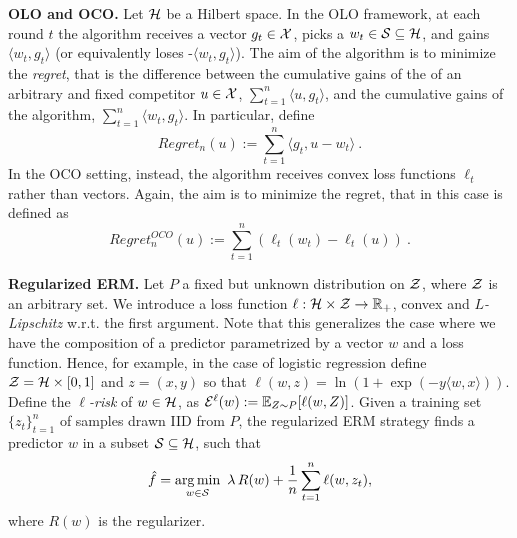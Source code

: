 \vspace{0.2cm}\noindent\textbf{\ac{OLO} and \ac{OCO}.}
Let $\mathcal{H}$ be a Hilbert space. In the \ac{OLO} framework, at each round $t$ the algorithm receives a vector $g_t \in \mathcal{X}$, picks a $w_t \in \mathcal{S} \subseteq \mathcal{H}$, and gains $\langle w_t,g_t \rangle$ (or equivalently loses -$\langle w_t,g_t \rangle$).
The aim of the algorithm is to minimize the \emph{regret}, that is the difference between the cumulative gains of the 
of an arbitrary and fixed competitor $u \in \mathcal{X}$, $\sum_{t=1}^n \langle u,g_t \rangle$, and 
the cumulative gains of the algorithm, $\sum_{t=1}^n \langle w_t,g_t \rangle$.
In particular, define
\[
Regret_n(u) := \sum_{t=1}^n \langle g_t , u - w_t \rangle~.
\]
In the \ac{OCO} setting, instead, the algorithm receives convex loss functions $\ell_t$ rather than vectors.
Again, the aim is to minimize the regret, that in this case is defined as
\[
Regret^{OCO}_n(u) := \sum_{t=1}^n \left(\ell_t(w_t) -\ell_t(u)\right)~.
\]

\vspace{0.2cm}\noindent\textbf{Regularized ERM.}
Let $P$ a fixed but unknown distribution on $\mathcal{Z}$, where $\mathcal{Z}$ is an arbitrary set.
We introduce a loss function  $\ell: \mathcal{H} \times \mathcal{Z} \rightarrow \mathbb{R}_+$, convex and \emph{$L$-Lipschitz} w.r.t. the first argument.
Note that this generalizes the case where we have the composition of a predictor parametrized by a vector $w$ and a loss function. Hence, for example, in the case of logistic regression define $\mathcal{Z}= \mathcal{H} \times [0,1]$ and $z=(x,y)$ so that
$\ell(w,z)=\ln\left(1+\exp(- y \langle w, x\rangle)\right)$.
Define the \emph{$\ell$-risk} of $w \in \mathcal{H}$, as $\mathcal{E}^{\ell}(w):=\mathbb{E}_{Z \sim P} [\ell(w,Z)]$.
Given a training set $\{z_t\}_{t=1}^n$ of samples drawn \ac{IID} from $P$, the regularized \ac{ERM} strategy finds a predictor $\hat{w}$ in a subset $\mathcal{S} \subseteq \mathcal{H}$, such that
\[
\hat{f}= \argmin_{w \in \fS} \ \lambda\, R(w) + \frac{1}{n} \sum_{t=1}^n \ell(w,z_t),
\]
where $R(w)$ is the regularizer.
